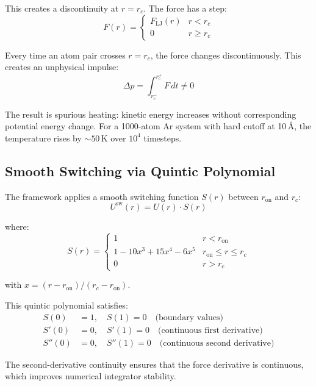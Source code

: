 \documentclass[11pt]{article}
\begin{document}
This creates a discontinuity at $r = r_c$. The force has a step:
\begin{equation}
F(r) = \begin{cases}
F_{\text{LJ}}(r) & r < r_c \\
0 & r \geq r_c
\end{cases}
\end{equation}

Every time an atom pair crosses $r = r_c$, the force changes discontinuously. This creates an unphysical impulse:
\begin{equation}
\Delta p = \int_{r_c^-}^{r_c^+} F\,dt \neq 0
\end{equation}

The result is spurious heating: kinetic energy increases without corresponding potential energy change. For a 1000-atom Ar system with hard cutoff at 10\,\AA, the temperature rises by $\sim 50$\,K over $10^4$ timesteps.

\subsection{Smooth Switching via Quintic Polynomial}

The framework applies a smooth switching function $S(r)$ between $r_{\text{on}}$ and $r_c$:
\begin{equation}
U^{\text{sw}}(r) = U(r) \cdot S(r)
\end{equation}

where:
\begin{equation}
S(r) = \begin{cases}
1 & r < r_{\text{on}} \\
1 - 10x^3 + 15x^4 - 6x^5 & r_{\text{on}} \leq r \leq r_c \\
0 & r > r_c
\end{cases}
\end{equation}

with $x = (r - r_{\text{on}}) / (r_c - r_{\text{on}})$.

This quintic polynomial satisfies:
\begin{align}
S(0) &= 1, \quad S(1) = 0 \quad \text{(boundary values)} \\
S'(0) &= 0, \quad S'(1) = 0 \quad \text{(continuous first derivative)} \\
S''(0) &= 0, \quad S''(1) = 0 \quad \text{(continuous second derivative)}
\end{align}

The second-derivative continuity ensures that the force derivative is continuous, which improves numerical integrator stability.
\end{document}
